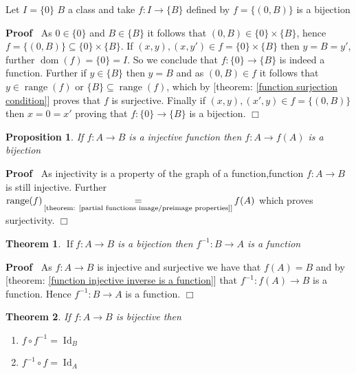 \documentclass{book}
\newcommand{\equallim}{\mathop{=}\limits}
\newcommand{\of}{:}
\newcommand{\tmop}[1]{\ensuremath{\operatorname{#1}}}
\newenvironment{proof}{\noindent\textbf{Proof\ }}{\hspace*{\fill}$\Box$\medskip}
\newtheorem{proposition}{Proposition}
{\theorembodyfont{\rmfamily}\newtheorem{remark}{Remark}}
\newtheorem{theorem}{Theorem}
\begin{document}
\begin{example}
  \label{function trivial bijection}Let $I = \{ 0 \}$ $B$ a class and take $f
  : I \rightarrow \{ B \}$ defined by $f = \{ (0, B) \}$ is a bijection
\end{example}

\begin{proof}
  As $0 \in \{ 0 \}$ and $B \in \{ B \}$ it follows that $(0, B) \in \{ 0 \}
  \times \{ B \}$, hence $f = \{ (0, B) \} \subseteq \{ 0 \} \times \{ B \}$.
  If $(x, y), (x, y') \in f = \{ 0 \} \times \{ B \}$ then $y = B = y'$,
  further $\tmop{dom} (f) = \{ 0 \} = I$. So we conclude that $f : \{ 0 \}
  \rightarrow \{ B \}$ is indeed a function. Further if $y \in \{ B \}$ then
  $y = B$ and as $(0, B) \in f$ it follows that $y \in \tmop{range} (f)$ or
  $\{ B \} \subseteq \tmop{range} (f)$, which by [theorem: \ref{function
  surjection condition}] proves that $f$ is surjective. Finally if $(x, y),
  (x', y) \in f = \{ (0, B) \}$ then $x = 0 = x'$ proving that $f : \{ 0 \}
  \rightarrow \{ B \}$ is a bijection.
\end{proof}

\begin{proposition}
  \label{function injectivity to bijection}If $f : A \rightarrow B$ is a
  injective function then $f : A \rightarrow f (A)$ is a bijection
\end{proposition}

\begin{proof}
  As injectivity is a property of the graph of a function,\quadthe function $f
  : A \rightarrow B$ is still injective. Further $\tmop{range} (f)
  \equallim_{\text{[theorem: \ref{partial functions image/preimage
  properties}]}} f (A)$ which proves surjectivity.
\end{proof}

\begin{theorem}
  \label{function bijection has a inverse}$\tmop{If} f : A \rightarrow B$ is a
  bijection then $f^{- 1} : B \rightarrow A$ is a function 
\end{theorem}

\begin{proof}
  As $f : A \rightarrow B$ is injective and surjective we have that $f (A) =
  B$ and by [theorem: \ref{function injective inverse is a function}] that
  $f^{- 1} \of f (A) \rightarrow B$ is a function. Hence $f^{- 1} : B
  \rightarrow A$ is a function.
\end{proof}

\begin{theorem}
  \label{function bijection f,f-1}If $f : A \rightarrow B$ is bijective then
  \begin{enumerate}
    \item $f \circ f^{- 1} = \tmop{Id}_B$
    
    \item $f^{- 1} \circ f = \tmop{Id}_A$
  \end{enumerate}
\end{theorem}
\end{document}
